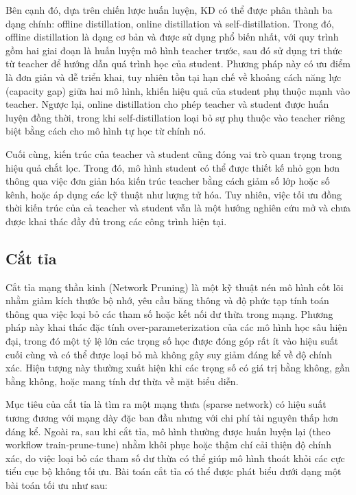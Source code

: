 Bên cạnh đó, dựa trên chiến lược huấn luyện, KD có thể được phân thành ba dạng chính: offline distillation, online distillation và self-distillation. Trong đó, offline distillation là dạng cơ bản và được sử dụng phổ biến nhất, với quy trình gồm hai giai đoạn là huấn luyện mô hình teacher trước, sau đó sử dụng tri thức từ teacher để hướng dẫn quá trình học của student. Phương pháp này có ưu điểm là đơn giản và dễ triển khai, tuy nhiên tồn tại hạn chế về khoảng cách năng lực (capacity gap) giữa hai mô hình, khiến hiệu quả của student phụ thuộc mạnh vào teacher. Ngược lại, online distillation cho phép teacher và student được huấn luyện đồng thời, trong khi self-distillation loại bỏ sự phụ thuộc vào teacher riêng biệt bằng cách cho mô hình tự học từ chính nó. 

Cuối cùng, kiến trúc của teacher và student cũng đóng vai trò quan trọng trong hiệu quả chắt lọc. Trong đó, mô hình student có thể được thiết kế nhỏ gọn hơn thông qua việc đơn giản hóa kiến trúc teacher bằng cách giảm số lớp hoặc số kênh, hoặc áp dụng các kỹ thuật như lượng tử hóa. Tuy nhiên, việc tối ưu đồng thời kiến trúc của cả teacher và student vẫn là một hướng nghiên cứu mở và chưa được khai thác đầy đủ trong các công trình hiện tại.
\subsection{Cắt tỉa}
Cắt tỉa mạng thần kinh (Network Pruning) là một kỹ thuật nén mô hình cốt lõi nhằm giảm kích thước bộ nhớ, yêu cầu băng thông và độ phức tạp tính toán thông qua việc loại bỏ các tham số hoặc kết nối dư thừa trong mạng. Phương pháp này khai thác đặc tính over-parameterization của các mô hình học sâu hiện đại, trong đó một tỷ lệ lớn các trọng số học được đóng góp rất ít vào hiệu suất cuối cùng và có thể được loại bỏ mà không gây suy giảm đáng kể về độ chính xác. Hiện tượng này thường xuất hiện khi các trọng số có giá trị bằng không, gần bằng không, hoặc mang tính dư thừa về mặt biểu diễn.

Mục tiêu của cắt tỉa là tìm ra một mạng thưa (sparse network) có hiệu suất tương đương với mạng dày đặc ban đầu nhưng với chi phí tài nguyên thấp hơn đáng kể. Ngoài ra, sau khi cắt tỉa, mô hình thường được huấn luyện lại (theo workflow train-prune-tune) nhằm khôi phục hoặc thậm chí cải thiện độ chính xác, do việc loại bỏ các tham số dư thừa có thể giúp mô hình thoát khỏi các cực tiểu cục bộ không tối ưu. Bài toán cắt tỉa có thể được phát biểu dưới dạng một bài toán tối ưu như sau:

